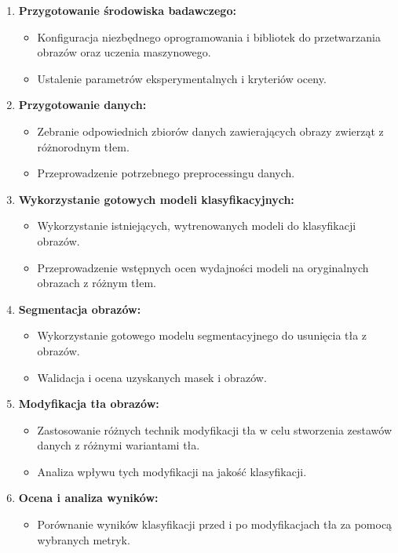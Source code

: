 \begin{enumerate}
    \item \textbf{Przygotowanie środowiska badawczego:}
    \begin{itemize}
        \item Konfiguracja niezbędnego oprogramowania i bibliotek do przetwarzania obrazów 
        oraz uczenia maszynowego.
        \item Ustalenie parametrów eksperymentalnych i kryteriów oceny.
    \end{itemize}
    \item \textbf{Przygotowanie danych:}
    \begin{itemize}
        \item Zebranie odpowiednich zbiorów danych zawierających obrazy zwierząt z różnorodnym tłem.
        \item Przeprowadzenie potrzebnego preprocessingu danych.
    \end{itemize}
    \item \textbf{Wykorzystanie gotowych modeli klasyfikacyjnych:}
    \begin{itemize}
        \item Wykorzystanie istniejących, wytrenowanych modeli do klasyfikacji obrazów.
        \item Przeprowadzenie wstępnych ocen wydajności modeli na oryginalnych obrazach z różnym tłem.
    \end{itemize}
    \item \textbf{Segmentacja obrazów:}
    \begin{itemize}
        \item Wykorzystanie gotowego modelu segmentacyjnego do usunięcia tła z obrazów.
        \item Walidacja i ocena uzyskanych masek i obrazów.
    \end{itemize}
    \item \textbf{Modyfikacja tła obrazów:}
    \begin{itemize}
        \item Zastosowanie różnych technik modyfikacji tła w celu stworzenia zestawów danych z różnymi 
        wariantami tła.
        \item Analiza wpływu tych modyfikacji na jakość klasyfikacji.
    \end{itemize}
    \item \textbf{Ocena i analiza wyników:}
    \begin{itemize}
        \item Porównanie wyników klasyfikacji przed i po modyfikacjach tła za pomocą wybranych metryk.

\end{itemize}
\end{enumerate}
